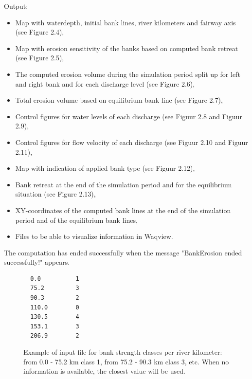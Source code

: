 Output:

\begin{itemize}
\item Map with waterdepth, initial bank lines, river kilometers and fairway axis (see Figure 2.4),
\item Map with erosion sensitivity of the banks based on computed bank retreat (see Figure 2.5),
\item The computed erosion volume during the simulation period split up for left and right bank and for each discharge level (see Figure 2.6),
\item Total erosion volume based on equilibrium bank line (see Figure 2.7),
\item Control figures for water levels of each discharge (see Figuur 2.8 and Figuur 2.9),
\item Control figures for flow velocity of each discharge (see Figuur 2.10 and Figuur 2.11),
\item Map with indication of applied bank type (see Figuur 2.12),
\item Bank retreat at the end of the simulation period and for the equilibrium situation (see Figure 2.13),
\item XY-coordinates of the computed bank lines at the end of the simulation period and of the equilibrium bank lines,
\item Files to be able to visualize information in Waqview.
\end{itemize}

The computation has ended successfully when the message "BankErosion ended successfully!" appears.

\begin{figure}
\begin{Verbatim}
  0.0          1
  75.2         3
  90.3         2
  110.0        0
  130.5        4
  153.1        3
  206.9        2
\end{Verbatim}
\caption{Example of input file for bank strength classes per river kilometer: from 0.0 - 75.2 km class 1, from 75.2 - 90.3 km class 3, etc.
When no information is available, the closest value will be used.}
\label{Fig2.3}
\end{figure}

